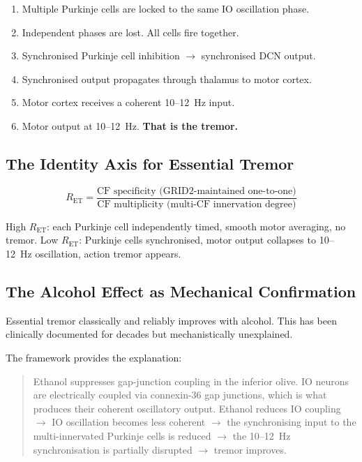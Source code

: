 \documentclass[12pt,a4paper]{article}
\newcommand{\ret}{$R_{\mathrm{ET}}$}
\begin{document}
\begin{enumerate}[leftmargin=2em, itemsep=0.3em]
  \item Multiple Purkinje cells are locked to the same IO oscillation phase.
  \item Independent phases are lost. All cells fire together.
  \item Synchronised Purkinje cell inhibition $\to$ synchronised DCN output.
  \item Synchronised output propagates through thalamus to motor cortex.
  \item Motor cortex receives a coherent 10--12~Hz input.
  \item Motor output at 10--12~Hz. \textbf{That is the tremor.}
\end{enumerate}

\subsection{The Identity Axis for Essential Tremor}

\begin{equation}
  R_{\mathrm{ET}} = \frac{\text{CF specificity (GRID2-maintained one-to-one)}}
                         {\text{CF multiplicity (multi-CF innervation degree)}}
\end{equation}

High \ret{}: each Purkinje cell independently timed, smooth motor averaging,
no tremor. Low \ret{}: Purkinje cells synchronised, motor output collapses
to 10--12~Hz oscillation, action tremor appears.

\subsection{The Alcohol Effect as Mechanical Confirmation}

Essential tremor classically and reliably improves with alcohol.
This has been clinically documented for decades but mechanistically
unexplained.

The framework provides the explanation:

\begin{quote}
Ethanol suppresses gap-junction coupling in the inferior olive. IO neurons
are electrically coupled via connexin-36 gap junctions, which is what
produces their coherent oscillatory output. Ethanol reduces IO coupling $\to$
IO oscillation becomes less coherent $\to$ the synchronising input to the
multi-innervated Purkinje cells is reduced $\to$ the 10--12~Hz
synchronisation is partially disrupted $\to$ tremor improves.
\end{quote}
\end{document}
